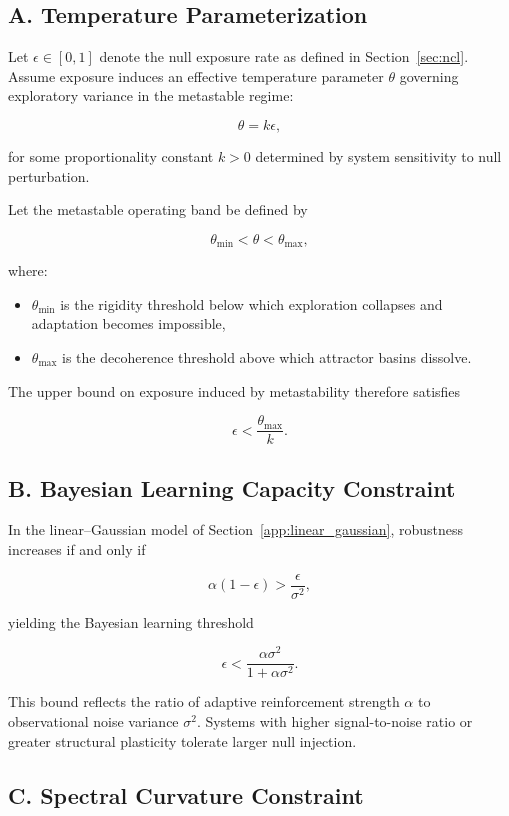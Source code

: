 \documentclass[11pt]{article}
\theoremstyle{remark}
\begin{document}
\subsection*{A. Temperature Parameterization}

Let $\epsilon \in [0,1]$ denote the null exposure rate as defined in Section~\ref{sec:ncl}. Assume exposure induces an effective temperature parameter $\theta$ governing exploratory variance in the metastable regime:

\[
\theta = k \epsilon,
\]

for some proportionality constant $k > 0$ determined by system sensitivity to null perturbation.

Let the metastable operating band be defined by

\[
\theta_{\min} < \theta < \theta_{\max},
\]

where:
\begin{itemize}
\item $\theta_{\min}$ is the rigidity threshold below which exploration collapses and adaptation becomes impossible,
\item $\theta_{\max}$ is the decoherence threshold above which attractor basins dissolve.
\end{itemize}

The upper bound on exposure induced by metastability therefore satisfies

\[
\epsilon < \frac{\theta_{\max}}{k}.
\]

\subsection*{B. Bayesian Learning Capacity Constraint}

In the linear--Gaussian model of Section~\ref{app:linear_gaussian}, robustness increases if and only if

\[
\alpha (1-\epsilon) > \frac{\epsilon}{\sigma^2},
\]

yielding the Bayesian learning threshold

\[
\epsilon < \frac{\alpha \sigma^2}{1 + \alpha \sigma^2}.
\]

This bound reflects the ratio of adaptive reinforcement strength $\alpha$ to observational noise variance $\sigma^2$. Systems with higher signal-to-noise ratio or greater structural plasticity tolerate larger null injection.

\subsection*{C. Spectral Curvature Constraint}
\end{document}
